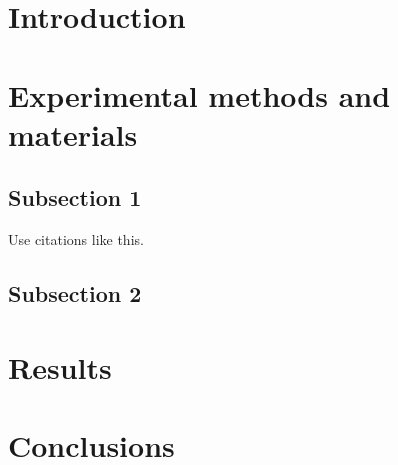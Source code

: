 \section{Introduction}


\lipsum[1-2]




\section{Experimental methods and materials}


\lipsum[1-2]

\subsection{Subsection 1}


Use citations like this\cite{Voyles2018a}.

\subsection{Subsection 2}

\lipsum[1]





\section{Results}


\lipsum[1-2]



\section{Conclusions}


\lipsum[1-2]